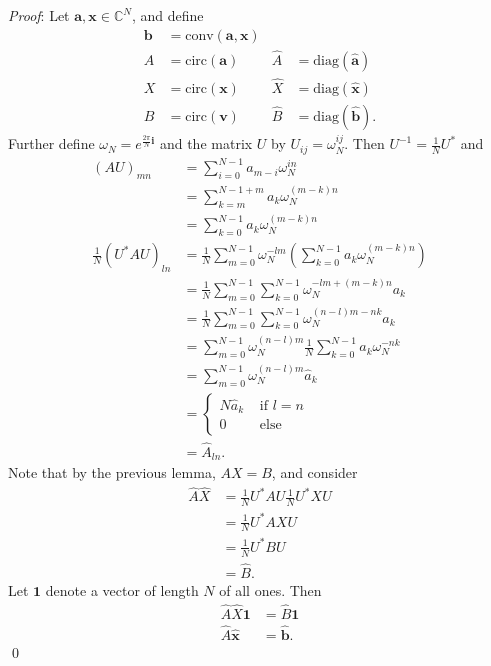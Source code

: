 \documentclass[12pt]{article}
\renewenvironment{proof}{\hspace{-4 ex} \emph{Proof}:}{\qed}
\newcommand{\CC}{\mathbb{C}}
\renewcommand{\vec}[1]{\boldsymbol{\mathbf{#1}}}
\begin{document}
\begin{proof}
	Let $\vec{a}, \vec{x} \in \CC^N$, and define
	\begin{align*}
		\vec{b} &= \text{conv}(\vec{a},\vec{x}) &&\\
		A &= \text{circ}(\vec{a}) & \hat{A} &= \text{diag}(\hat{\vec{a}}) \\
		X &= \text{circ}(\vec{x}) & \hat{X} &= \text{diag}(\hat{\vec{x}}) \\
		B &= \text{circ}(\vec{v}) & \hat{B} &= \text{diag}(\hat{\vec{b}}) \text{.}
	\end{align*}
	Further define $\omega_N = e^{\frac{2\pi}{N}\mathbf{i}}$ and the matrix $U$ by $U_{ij} = \omega_N^{ij}$. Then $U^{-1} = \frac{1}{N}U^{*}$ and 
	\begin{align*}
	(AU)_{mn} &= \sum\limits_{i=0}^{N-1}a_{m-i}\omega_N^{in} \\
	&= \sum\limits_{k=m}^{N-1+m}a_{k}\omega_N^{(m-k)n} \\
	&= \sum\limits_{k=0}^{N-1}a_{k}\omega_N^{(m-k)n} \\
	\frac{1}{N}(U^{*}AU)_{ln} &= \frac{1}{N} \sum\limits_{m=0}^{N-1} \omega_N^{-lm} \left( \sum\limits_{k=0}^{N-1}a_{k}\omega_N^{(m-k)n} \right) \\
	&= \frac{1}{N} \sum\limits_{m=0}^{N-1}\sum\limits_{k=0}^{N-1} \omega_N^{-lm + (m-k)n} a_{k} \\
	&= \frac{1}{N} \sum\limits_{m=0}^{N-1}\sum\limits_{k=0}^{N-1} \omega_N^{(n-l)m -nk} a_{k} \\
	&= \sum\limits_{m=0}^{N-1} \omega_N^{(n-l)m} \frac{1}{N} \sum\limits_{k=0}^{N-1} a_{k}\omega_N^{-nk}  \\
	& = \sum\limits_{m=0}^{N-1} \omega_N^{(n-l)m} \hat{a}_k \\
	& = \begin{cases} N \hat{a}_k & \text{ if } l=n \\
					0 & \text{ else}
		\end{cases} \\
	&= \hat{A}_{ln} \text{.}
	\end{align*}
	Note that by the previous lemma, $AX = B$, and consider
	\begin{align*}
		\hat{A}\hat{X} & = \frac{1}{N}U^{*}AU \frac{1}{N}U^{*}XU \\
		& = \frac{1}{N}U^{*}AXU \\
		& = \frac{1}{N}U^{*}BU \\
		& = \hat{B} \text{.}
	\end{align*}
	Let $\vec{1}$ denote a vector of length $N$ of all ones. Then
	\begin{align*}
	\hat{A}\hat{X} \vec{1} &= \hat{B} \vec{1} \\
	\hat{A}\hat{\vec{x}} &= \hat{\vec{b}} \text{.}
	\end{align*}
\end{proof}
\end{document}
